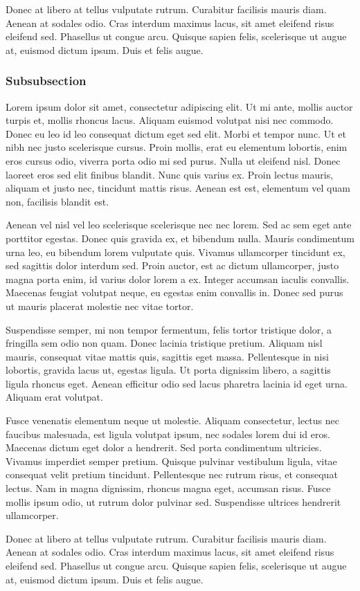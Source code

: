 Donec at libero at tellus vulputate rutrum. Curabitur facilisis mauris diam. Aenean at sodales odio. Cras interdum maximus lacus, sit amet eleifend risus eleifend sed. Phasellus ut congue arcu. Quisque sapien felis, scelerisque ut augue at, euismod dictum ipsum. Duis et felis augue.

\subsubsection{Subsubsection}
Lorem ipsum dolor sit amet, consectetur adipiscing elit. Ut mi ante, mollis auctor turpis et, mollis rhoncus lacus. Aliquam euismod volutpat nisi nec commodo. Donec eu leo id leo consequat dictum eget sed elit. Morbi et tempor nunc. Ut et nibh nec justo scelerisque cursus. Proin mollis, erat eu elementum lobortis, enim eros cursus odio, viverra porta odio mi sed purus. Nulla ut eleifend nisl. Donec laoreet eros sed elit finibus blandit. Nunc quis varius ex. Proin lectus mauris, aliquam et justo nec, tincidunt mattis risus. Aenean est est, elementum vel quam non, facilisis blandit est.

Aenean vel nisl vel leo scelerisque scelerisque nec nec lorem. Sed ac sem eget ante porttitor egestas. Donec quis gravida ex, et bibendum nulla. Mauris condimentum urna leo, eu bibendum lorem vulputate quis. Vivamus ullamcorper tincidunt ex, sed sagittis dolor interdum sed. Proin auctor, est ac dictum ullamcorper, justo magna porta enim, id varius dolor lorem a ex. Integer accumsan iaculis convallis. Maecenas feugiat volutpat neque, eu egestas enim convallis in. Donec sed purus ut mauris placerat molestie nec vitae tortor.

Suspendisse semper, mi non tempor fermentum, felis tortor tristique dolor, a fringilla sem odio non quam. Donec lacinia tristique pretium. Aliquam nisl mauris, consequat vitae mattis quis, sagittis eget massa. Pellentesque in nisi lobortis, gravida lacus ut, egestas ligula. Ut porta dignissim libero, a sagittis ligula rhoncus eget. Aenean efficitur odio sed lacus pharetra lacinia id eget urna. Aliquam erat volutpat.

Fusce venenatis elementum neque ut molestie. Aliquam consectetur, lectus nec faucibus malesuada, est ligula volutpat ipsum, nec sodales lorem dui id eros. Maecenas dictum eget dolor a hendrerit. Sed porta condimentum ultricies. Vivamus imperdiet semper pretium. Quisque pulvinar vestibulum ligula, vitae consequat velit pretium tincidunt. Pellentesque nec rutrum risus, et consequat lectus. Nam in magna dignissim, rhoncus magna eget, accumsan risus. Fusce mollis ipsum odio, ut rutrum dolor pulvinar sed. Suspendisse ultrices hendrerit ullamcorper.

Donec at libero at tellus vulputate rutrum. Curabitur facilisis mauris diam. Aenean at sodales odio. Cras interdum maximus lacus, sit amet eleifend risus eleifend sed. Phasellus ut congue arcu. Quisque sapien felis, scelerisque ut augue at, euismod dictum ipsum. Duis et felis augue.